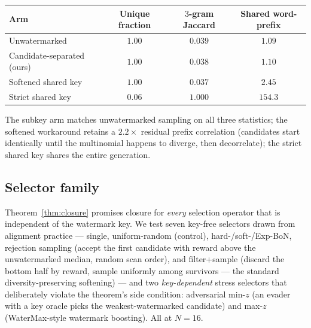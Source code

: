 \documentclass{article} %
\begin{document}
\begin{center}
\small
\begin{tabular}{lccc}
\toprule
Arm & Unique fraction & $3$-gram Jaccard & Shared word-prefix \\
\midrule
Unwatermarked & $1.00$ & $0.039$ & $1.09$ \\
Candidate-separated (ours) & $1.00$ & $0.038$ & $1.10$ \\
Softened shared key & $1.00$ & $0.037$ & $2.45$ \\
Strict shared key & $0.06$ & $1.000$ & $154.3$ \\
\bottomrule
\end{tabular}
\end{center}

The subkey arm matches unwatermarked sampling on all three statistics; the
softened workaround retains a $2.2\times$ residual prefix correlation (candidates
start identically until the multinomial happens to diverge, then decorrelate);
the strict shared key shares the entire generation.

\subsection{Selector family}\label{app:selectors}
Theorem~\ref{thm:closure} promises closure for \emph{every} selection operator
that is independent of the watermark key. We test seven key-free selectors
drawn from alignment practice --- single, uniform-random (control),
hard-/soft-/Exp-BoN, rejection sampling (accept the first candidate with reward
above the unwatermarked median, random scan order), and filter+sample (discard
the bottom half by reward, sample uniformly among survivors --- the standard
diversity-preserving softening) --- and two \emph{key-dependent} stress selectors
that deliberately violate the theorem's side condition: adversarial min-$z$
(an evader with a key oracle picks the weakest-watermarked candidate) and
max-$z$ (WaterMax-style watermark boosting). All at $N{=}16$.
\end{document}
